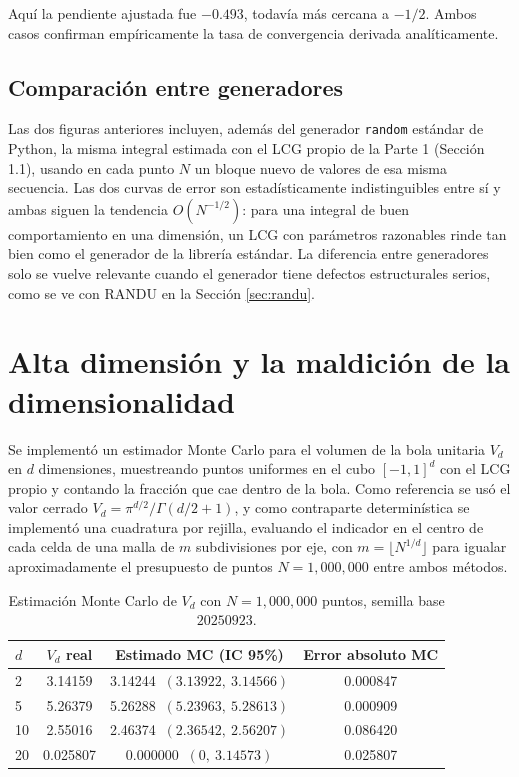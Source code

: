 \documentclass[11pt]{article}
\begin{document}
Aquí la pendiente ajustada fue $-0.493$, todavía más cercana a $-1/2$. Ambos casos confirman empíricamente la tasa de convergencia derivada analíticamente.

\subsection{Comparación entre generadores}

Las dos figuras anteriores incluyen, además del generador \texttt{random} estándar de Python, la misma integral estimada con el LCG propio de la Parte 1 (Sección 1.1), usando en cada punto $N$ un bloque nuevo de valores de esa misma secuencia. Las dos curvas de error son estadísticamente indistinguibles entre sí y ambas siguen la tendencia $O(N^{-1/2})$: para una integral de buen comportamiento en una dimensión, un LCG con parámetros razonables rinde tan bien como el generador de la librería estándar. La diferencia entre generadores solo se vuelve relevante cuando el generador tiene defectos estructurales serios, como se ve con RANDU en la Sección \ref{sec:randu}.

\section{Alta dimensión y la maldición de la dimensionalidad}
\label{sec:altadim}

Se implementó un estimador Monte Carlo para el volumen de la bola unitaria $V_d$ en $d$ dimensiones, muestreando puntos uniformes en el cubo $[-1,1]^d$ con el LCG propio y contando la fracción que cae dentro de la bola. Como referencia se usó el valor cerrado $V_d = \pi^{d/2}/\Gamma(d/2+1)$, y como contraparte determinística se implementó una cuadratura por rejilla, evaluando el indicador en el centro de cada celda de una malla de $m$ subdivisiones por eje, con $m=\lfloor N^{1/d}\rfloor$ para igualar aproximadamente el presupuesto de puntos $N=1{,}000{,}000$ entre ambos métodos.

\begin{table}[H]
\centering
\begin{tabular}{lccc}
\toprule
$d$ & $V_d$ real & Estimado MC (IC 95\%) & Error absoluto MC \\
\midrule
2 & 3.14159 & 3.14244 $\ (3.13922,\ 3.14566)$ & 0.000847 \\
5 & 5.26379 & 5.26288 $\ (5.23963,\ 5.28613)$ & 0.000909 \\
10 & 2.55016 & 2.46374 $\ (2.36542,\ 2.56207)$ & 0.086420 \\
20 & 0.025807 & 0.000000 $\ (0,\ 3.14573)$ & 0.025807 \\
\bottomrule
\end{tabular}
\caption{Estimación Monte Carlo de $V_d$ con $N=1{,}000{,}000$ puntos, semilla base $20250923$.}
\end{table}
\end{document}
